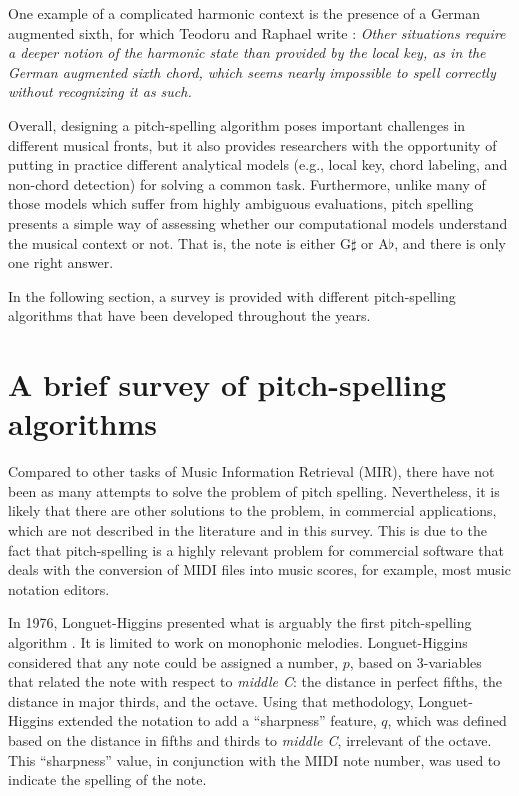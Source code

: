 One example of a complicated harmonic context is the presence of a German augmented sixth, for which Teodoru and Raphael write \cite{teodoru2007pitch}: \emph{Other situations require a deeper notion of the harmonic state than provided by the local key, as in the German augmented sixth chord, which seems nearly impossible to spell correctly without recognizing it as such.}

Overall, designing a pitch-spelling algorithm poses important challenges in different musical fronts, but it also provides researchers with the opportunity of putting in practice different analytical models (e.g., local key, chord labeling, and non-chord detection) for solving a common task. Furthermore, unlike many of those models which suffer from highly ambiguous evaluations, pitch spelling presents a simple way of assessing whether our computational models understand the musical context or not. That is, the note is either G$\sharp$ or A$\flat$, and there is only one right answer.

In the following section, a survey is provided with different pitch-spelling algorithms that have been developed throughout the years.

\section{A brief survey of pitch-spelling algorithms}

Compared to other tasks of Music Information Retrieval (MIR), there have not been as many attempts to solve the problem of pitch spelling. Nevertheless, it is likely that there are other solutions to the problem, in commercial applications, which are not described in the literature and in this survey. This is due to the fact that pitch-spelling is a highly relevant problem for commercial software that deals with the conversion of MIDI files into music scores, for example, most music notation editors.

In 1976, Longuet-Higgins presented what is arguably the first pitch-spelling algorithm \cite{longuethiggins1976perception}. It is limited to work on monophonic melodies. Longuet-Higgins considered that any note could be assigned a number, $p$, based on 3-variables that related the note with respect to \emph{middle C}: the distance in perfect fifths, the distance in major thirds, and the octave. Using that methodology, Longuet-Higgins extended the notation to add a ``sharpness'' feature, $q$, which was defined based on the distance in fifths and thirds to \emph{middle C}, irrelevant of the octave. This ``sharpness'' value, in conjunction with the MIDI note number, was used to indicate the spelling of the note.

